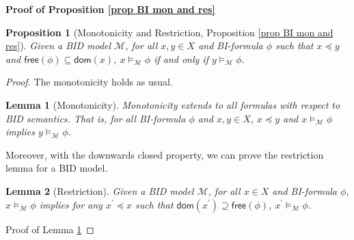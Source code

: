 \documentclass[conference,compsoc, 10pt]{IEEEtran}
\newtheorem{lemma}{Lemma}[section]
\newtheorem{proposition}{Proposition}[section]
\newcommand {\cM } {{\mathcal{M}}}
\newcommand {\Ldom }[1] {{\mathsf{dom}\!\left(#1\right)}}
\newcommand {\Lfree }[1] {{\mathsf{free}{\left(#1\right)}}}
\begin{document}
\begin{appendices}
		\noindent\textbf{Proof of Proposition \ref{prop BI mon and res}}
		
		\begin{proposition}[Monotonicity and Restriction, Proposition \ref{prop BI mon and res}]
			Given a BID model $\cM$, 
			for all $x,y\in X$ and BI-formula $\phi$ such that $x\preceq y$ and $\Lfree{\phi}\subseteq\Ldom{x}$, 
			$x\models_\cM \phi$ if and only if $y\models_\cM \phi$.
		\end{proposition}
		
		\begin{proof}
			The monotonicity holds as usual.
			\begin{lemma}[Monotonicity]
				\label{lem BI monotonicity}
				Monotonicity extends to all formulas with respect to BID semantics. That is, for all BI-formula $\phi$ and $x,y\in X$, $x\preceq y$ and $x\models_\cM\phi$ implies $y\models_\cM\phi$.
			\end{lemma}
			
			Moreover, with the downwards closed property, we can prove the restriction lemma for a BID model.
			
			\begin{lemma}[Restriction] 
				\label{lem BI retriction}
				Given a BID model $\cM$, for all $x\in X$ and BI-formula $\phi$,
				$x\models_\cM \phi$ implies for any $x^\prime\preceq x$ such that $\Ldom{x^\prime}\supseteq\Lfree{\phi}$, $x^\prime\models_\cM\phi$.
			\end{lemma}
			
			\noindent Proof of Lemma \ref{lem BI monotonicity}
			
			\vspace{0.2cm}
			

\end{proof}
\end{appendices}
\end{document}
